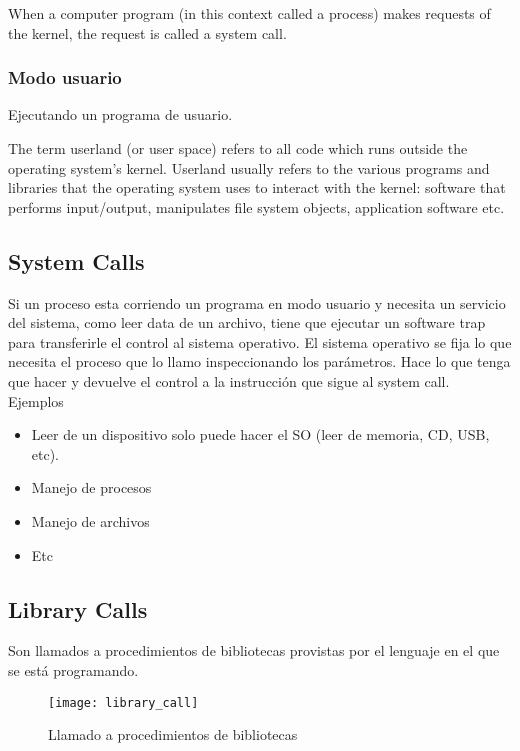 \documentclass[a4paper, twoside]{article}
\begin{document}
When a computer program (in this context called a process) makes requests of the kernel, the request is called a system call.

\subsubsection{Modo usuario}
Ejecutando un programa de usuario.

The term userland (or user space) refers to all code which runs outside the operating system's kernel. Userland usually refers to the various programs and libraries that the operating system uses to interact with the kernel: software that performs input/output, manipulates file system objects, application software etc.

\subsection{System Calls}
Si un proceso esta corriendo un programa en modo usuario y necesita un servicio del sistema, como leer data de un archivo, tiene que ejecutar un software trap para transferirle el control al sistema operativo. El sistema operativo se fija lo que necesita el proceso que lo  llamo inspeccionando los parámetros. Hace lo que tenga que hacer y devuelve el control a la instrucción que sigue al system call.\\

Ejemplos
\begin{itemize}
	\item Leer de un dispositivo solo puede hacer el SO (leer de memoria, CD, USB, etc).
	\item Manejo de procesos
	\item Manejo de archivos
	\item Etc
\end{itemize}

\subsection{Library Calls}
Son llamados a procedimientos de bibliotecas provistas por el lenguaje en el que se está programando.\\

\begin{figure}[H]
	\centering
	\texttt{[image: library\_call]}
	\caption{Llamado a procedimientos de bibliotecas}
	\label{fig:library_call}
\end{figure}
\end{document}
